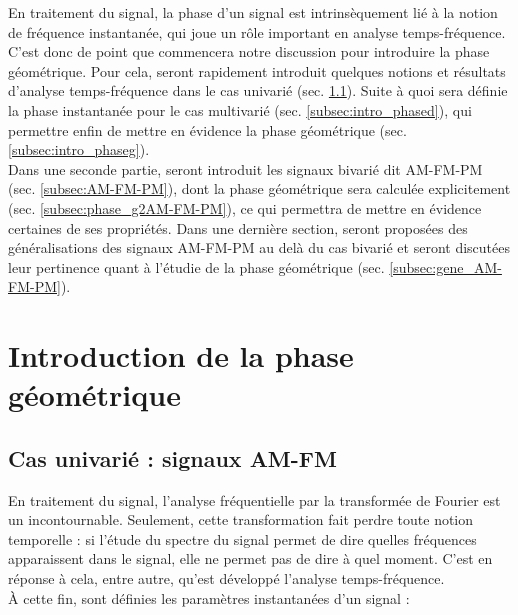 
En traitement du signal, la phase d'un signal est intrinsèquement lié à la notion de fréquence instantanée, qui joue un rôle important en analyse temps-fréquence. 
C'est donc de point que commencera notre discussion pour introduire la phase géométrique.
Pour cela, seront rapidement introduit quelques notions et résultats d'analyse temps-fréquence dans le cas univarié (sec. \ref{subsec:ana_temp-freq}). Suite à quoi sera définie la phase instantanée pour le cas multivarié (sec. \ref{subsec:intro_phased}), qui permettre enfin de mettre en évidence la phase géométrique (sec. \ref{subsec:intro_phaseg}).
\\

Dans une seconde partie, seront introduit les signaux bivarié dit AM-FM-PM  (sec. \ref{subsec:AM-FM-PM}), dont la phase géométrique sera calculée explicitement (sec. \ref{subsec:phase_g2AM-FM-PM}), ce qui permettra de mettre en évidence certaines de ses propriétés. Dans une dernière section, seront proposées des généralisations des signaux AM-FM-PM au delà du cas bivarié et seront discutées leur pertinence quant à l'étudie de la phase géométrique (sec. \ref{subsec:gene_AM-FM-PM}). 

\section{Introduction de la phase géométrique} \label{sec:intro_phaseg}




\subsection{Cas univarié : signaux AM-FM} \label{subsec:ana_temp-freq}


En traitement du signal, l'analyse fréquentielle par la transformée de Fourier est un incontournable. 
Seulement, cette transformation fait perdre toute notion temporelle : si l'étude du spectre du signal permet de dire quelles fréquences apparaissent dans le signal, elle ne permet pas de dire à quel moment. 
C'est en réponse à cela, entre autre, qu'est développé l'analyse temps-fréquence. 
\\
À cette fin, sont définies les paramètres instantanées d'un signal :\par

